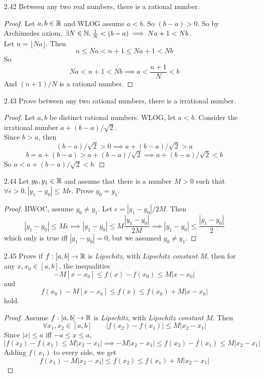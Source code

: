 \documentclass[14pt]{extarticle}
\begin{document}
\begin{enumerate}
\begin{proof}
		\end{proof}
		\item[2.42] Between any two real numbers, there is a rational number.
		\begin{proof}
			Let $a,b \in \mathbb{R}$ and WLOG assume $a<b$. So $(b-a)>0$. So by Archimedes axiom, $\exists N \in \mathbb{N}, \frac{1}{N} < (b-a) \implies Na+ 1 < Nb$.\\
			Let $n = \lfloor Na \rfloor$. Then \[n \leq Na < n+1 \leq Na+1 <Nb\]
			So \[Na < n+1 < Nb \implies a < \frac{n+1}{N} < b \]
			And $(n+1)/N$ is a rational number.
		\end{proof}
		\item[2.43] Prove between any two rational numbers, there is a irrational number.
		\begin{proof}
			Let $a,b$ be distinct rational numbers. WLOG, let $a<b$. Consider the irrational number $a + (b-a)/\sqrt{2}$.\\
			Since $b>a$, then 
			\[(b-a)/\sqrt{2} > 0 \implies a + (b-a)/\sqrt{2} > a\]
			\[b = a + (b-a) > a + (b-a)/\sqrt{2} \implies a + (b-a)/\sqrt{2} < b\]
			So $a < a + (b-a)/\sqrt{2} < b$.
		\end{proof}
		\item[2.44] Let $y_0,y_1 \in \mathbb{R}$ and assume that there is a number $M > 0$ such that $\forall \epsilon > 0, |y_1-y_0| \leq M\epsilon$. Prove $y_0=y_1$.
		\begin{proof}
			BWOC, assume $y_0 \neq y_1$. Let $\epsilon = |y_1 - y_0|/2M$. Then \[|y_1 - y_0| \leq M\epsilon \implies |y_1 - y_0| \leq M\frac{|y_1 - y_0|}{2M} \implies |y_1 - y_0| \leq \frac{|y_1 - y_0|}{2}\]
			which only is true iff $|y_1 - y_0| = 0$, but we assumed $y_0 \neq y_1$. \contra
		\end{proof}
		\item[2.45] Prove if $f:[a,b] \rightarrow \mathbb{R}$ is \emph{Lipschitz}, with \emph{Lipschitz constant} $M$, then for any $x,x_0 \in [a,b]$, the inequalities 
		\[-M[x-x_0] \leq f(x)-f(x_0) \leq M|x-x_0|\] and
		\[f(x_0)-M[x-x_0] \leq f(x) \leq f(x_0) + M|x-x_0|\] hold.
		\begin{proof}
			Assume $f:[a,b] \rightarrow \mathbb{R}$ is \emph{Lipschitz}, with \emph{Lipschitz constant} $M$. Then 
			\[\forall x_1,x_2 \in [a,b] \qquad |f(x_2)-f(x_1)| \leq M|x_2-x_1|\]
			Since $|x| \leq a$ iff $-a \leq x \leq a$,
			\[|f(x_2)-f(x_1) \leq M|x_2-x_1| \implies -M|x_2-x_1| \leq f(x_2)-f(x_1) \leq M|x_2-x_1|\]
			Adding $f(x_1)$ to every side, we get 
			\[f(x_1) - M|x_2-x_1| \leq f(x_2) \leq f(x_1) + M|x_2-x_1|\]
		\end{proof}

\end{enumerate}
\end{document}
